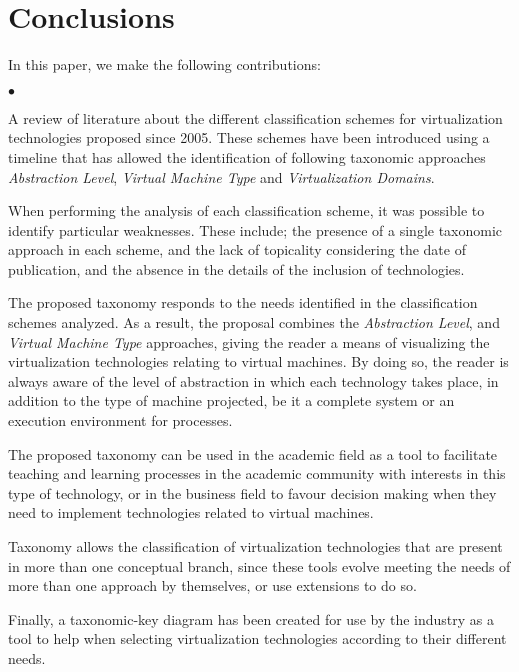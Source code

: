 	\section {Conclusions}\label{sec:conclusion}
	
	In this paper, we make the following contributions:  
	
	\begin{list}{$\bullet$}{\setlength{\leftmargin}{5pt}}
	
	    \item A review of literature about the different classification schemes for virtualization technologies proposed since 2005. These schemes have been introduced using a timeline that has allowed the identification of following taxonomic approaches \textit{Abstraction Level}, \textit{Virtual Machine Type} and \textit{Virtualization Domains}.
		
		\item When performing the analysis of each classification scheme, it was possible to identify particular weaknesses. These include; the presence of a single taxonomic approach in each scheme, and the lack of topicality considering the date of publication, and the absence in the details of the inclusion of technologies.
		
		\item The proposed taxonomy responds to the needs identified in the classification schemes analyzed. As a result, the proposal combines the \textit{Abstraction Level}, and \textit{Virtual Machine Type} approaches, giving the reader a means of visualizing the virtualization technologies relating to virtual machines. By doing so, the reader is always aware of the level of abstraction in which each technology takes place, in addition to the type of machine projected, be it a complete system or an execution environment for processes.
		
		\item The proposed taxonomy can be used in the academic field as a tool to facilitate teaching and learning processes in the academic community with interests in this type of technology, or in the business field to favour decision making when they need to implement technologies related to virtual machines. 
		
		\item Taxonomy allows the classification of virtualization technologies that are present in more than one conceptual branch, since these tools evolve meeting the needs of more than one approach by themselves, or use extensions to do so.
		
		\item Finally, a taxonomic-key diagram has been created for use by the industry as a tool to help when selecting virtualization technologies according to their different needs.

	\end{list}
